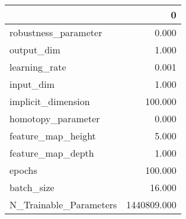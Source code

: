 \begin{tabular}{lr}
\toprule
{} &            0 \\
\midrule
robustness\_parameter   &        0.000 \\
output\_dim             &        1.000 \\
learning\_rate          &        0.001 \\
input\_dim              &        1.000 \\
implicit\_dimension     &      100.000 \\
homotopy\_parameter     &        0.000 \\
feature\_map\_height     &        5.000 \\
feature\_map\_depth      &        1.000 \\
epochs                 &      100.000 \\
batch\_size             &       16.000 \\
N\_Trainable\_Parameters &  1440809.000 \\
\bottomrule
\end{tabular}
